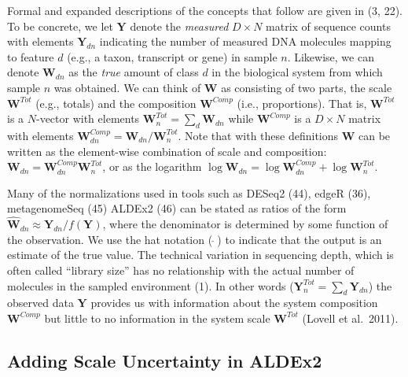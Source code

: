 \documentclass[
]{article}
\begin{document}
Formal and expanded descriptions of the concepts that follow are given
in (3, 22). To be concrete, we let \(\mathbf{Y}\) denote the
\emph{measured} \(D \times N\) matrix of sequence counts with elements
\(\mathbf{Y}_{dn}\) indicating the number of measured DNA molecules
mapping to feature \(d\) (e.g., a taxon, transcript or gene) in sample
\(n\). Likewise, we can denote \(\mathbf{W}_{dn}\) as the \emph{true}
amount of class \(d\) in the biological system from which sample \(n\)
was obtained. We can think of \(\mathbf{W}\) as consisting of two parts,
the scale \(\mathbf{W}^{Tot}\) (e.g., totals) and the composition
\(\mathbf{W}^{Comp}\) (i.e., proportions). That is, \(\mathbf{W}^{Tot}\)
is a \(N\)-vector with elements
\(\mathbf{W}^{Tot}_{n}=\sum_{d}\mathbf{W}_{dn}\) while
\(\mathbf{W}^{Comp}\) is a \(D \times N\) matrix with elements
\(\mathbf{W}^{Comp}_{dn}=\mathbf{W}_{dn}/\mathbf{W}^{Tot}_{n}\). Note
that with these definitions \(\mathbf{W}\) can be written as the
element-wise combination of scale and composition:
\(\mathbf{W}_{dn}=\mathbf{W}^{Comp}_{dn}\mathbf{W}^{Tot}_{n}\), or as
the logarithm
\(\log \mathbf{W}_{dn}= \log \mathbf{W}^{Comp}_{dn} + \log \mathbf{W}^{Tot}_{n}\).

Many of the normalizations used in tools such as DESeq2 (44), edgeR
(36), metagenomeSeq (45) ALDEx2 (46) can be stated as ratios of the form
\(\hat{{\mathbf{W}}}_{dn} \approx \mathbf{Y}_{dn}/f(\mathbf{Y})\), where
the denominator is determined by some function of the observation. We
use the hat notation (\(\ \hat{}\ \)) to indicate that the output is an
estimate of the true value. The technical variation in sequencing depth,
which is often called ``library size'' has no relationship with the
actual number of molecules in the sampled environment (1). In other
words (\(\mathbf{Y}^{Tot}_{n}=\sum_{d}\mathbf{Y}_{dn}\)) the observed
data \(\mathbf{Y}\) provides us with information about the system
composition \(\mathbf{W}^{Comp}\) but little to no information in the
system scale \(\mathbf{W}^{Tot}\) (Lovell et al.~2011).

\subsection{Adding Scale Uncertainty in
ALDEx2}\label{adding-scale-uncertainty-in-aldex2}
\end{document}
